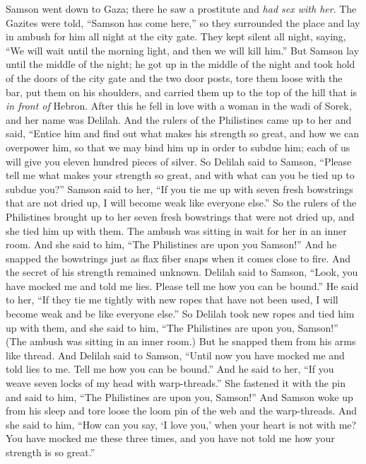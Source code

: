 \begin{biblechapter} %
 Samson went down to Gaza; there he saw a prostitute and \textit{had sex with her}.
\verse The Gazites were told, “Samson has come here,” so they surrounded the place and lay in ambush for him all night at the city gate. They kept silent all night, saying, “We will wait until the morning light, and then we will kill him.”
\verse But Samson lay until the middle of the night; he got up in the middle of the night and took hold of the doors of the city gate and the two door posts, tore them loose with the bar, put them on his shoulders, and carried them up to the top of the hill that is \textit{in front of} Hebron.
\verse After this he fell in love with a woman in the wadi of Sorek, and her name was Delilah.
\verse And the rulers of the Philistines came up to her and said, “Entice him and find out what makes his strength so great, and how we can overpower him, so that we may bind him up in order to subdue him; each of us will give you eleven hundred pieces of silver.
\verse So Delilah said to Samson, “Please tell me what makes your strength so great, and with what can you be tied up to subdue you?”
\verse Samson said to her, “If you tie me up with seven fresh bowstrings that are not dried up, I will become weak like everyone else.”
\verse So the rulers of the Philistines brought up to her seven fresh bowstrings that were not dried up, and she tied him up with them.
\verse The ambush was sitting in wait for her in an inner room. And she said to him, “The Philistines are upon you Samson!” And he snapped the bowstrings just as flax fiber snaps when it comes close to fire. And the secret of his strength remained unknown.
\verse Delilah said to Samson, “Look, you have mocked me and told me lies. Please tell me how you can be bound.”
\verse He said to her, “If they tie me tightly with new ropes that have not been used, I will become weak and be like everyone else.”
\verse So Delilah took new ropes and tied him up with them, and she said to him, “The Philistines are upon you, Samson!” (The ambush was sitting in an inner room.) But he snapped them from his arms like thread.
\verse And Delilah said to Samson, “Until now you have mocked me and told lies to me. Tell me how you can be bound.” And he said to her, “If you weave seven locks of my head with warp-threads.”
\verse She fastened it with the pin and said to him, “The Philistines are upon you, Samson!” And Samson woke up from his sleep and tore loose the loom pin of the web and the warp-threads.
\verse And she said to him, “How can you say, ‘I love you,’ when your heart is not with me? You have mocked me these three times, and you have not told me how your strength is so great.”

\end{biblechapter}
